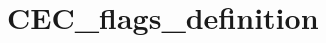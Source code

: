 \hypertarget{group___c_e_c__flags__definition}{\section{C\-E\-C\-\_\-flags\-\_\-definition}
\label{group___c_e_c__flags__definition}
}
